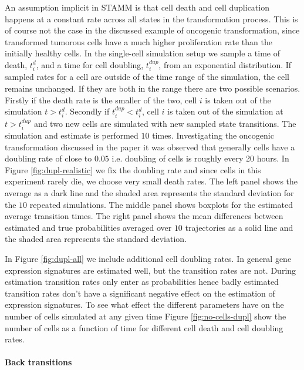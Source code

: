 An assumption implicit in STAMM is that cell death and cell duplication happens at a constant rate across all states in the transformation process. This is of course not the case in the discussed example of oncogenic transformation, since transformed tumorous cells have a much higher proliferation rate than the initially healthy cells. In the single-cell simulation setup we sample a time of death, $t_i^{d}$, and a time for cell doubling, $t_i^{dup}$, from an exponential distribution. If sampled rates for a cell are outside of the time range of the simulation, the cell remains unchanged. If they are both in the range there are two possible scenarios. Firstly if the death rate is the smaller of the two, cell $i$ is taken out of the simulation $t>t_i^d$. Secondly if $t_i^{dup}<t_i^d$, cell $i$ is taken out of the simulation at $t > t_i^{dup}$ and two new cells are simulated with new sampled state transitions. The simulation and estimate is performed $10$ times. Investigating the oncogenic transformation discussed in the paper it was observed that generally cells have a doubling rate of close to $0.05$ i.e. doubling of cells is roughly every 20 hours. In Figure \ref{fig:dupl-realistic} we fix the doubling rate and since cells in this experiment rarely die, we choose very small death rates. The left panel shows the average as a dark line and the shaded area represents the standard deviation for the $10$ repeated simulations. The middle panel shows boxplots for the estimated average transition times. The right panel shows the mean differences between estimated and true probabilities averaged over $10$ trajectories as a solid line and the shaded area represents the standard deviation.

In Figure \ref{fig:dupl-all} we include additional cell doubling rates. In general gene expression signatures are estimated well, but the transition rates are not. During estimation transition rates only enter as probabilities hence badly estimated transition rates don't have a significant negative effect on the estimation of expression signatures. To see what effect the different parameters have on the number of cells simulated at any given time Figure \ref{fig:no-cells-dupl} show the number of cells as a function of time for different cell death and cell doubling rates.



\paragraph{Back transitions}
\label{sec:back-transitions}

